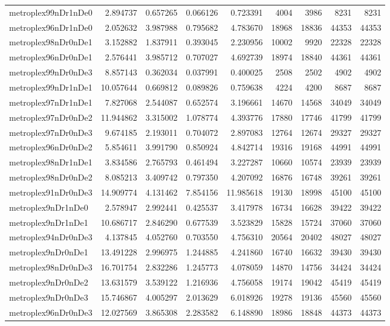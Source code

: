 \begin{longtable}{|l|r|r|r|r|r|r|r|r|}
metroplex99nDr1nDe0 & 2.894737 & 0.657265 & 0.066126 & 0.723391 & 4004 & 3986 & 8231 & 8231 \\
metroplex96nDr1nDe0 & 2.052632 & 3.987988 & 0.795682 & 4.783670 & 18968 & 18836 & 44353 & 44353 \\
metroplex98nDr0nDe1 & 3.152882 & 1.837911 & 0.393045 & 2.230956 & 10002 & 9920 & 22328 & 22328 \\
metroplex96nDr0nDe1 & 2.576441 & 3.985712 & 0.707027 & 4.692739 & 18974 & 18840 & 44361 & 44361 \\
metroplex99nDr0nDe3 & 8.857143 & 0.362034 & 0.037991 & 0.400025 & 2508 & 2502 & 4902 & 4902 \\
metroplex99nDr1nDe1 & 10.057644 & 0.669812 & 0.089826 & 0.759638 & 4224 & 4200 & 8687 & 8687 \\
metroplex97nDr1nDe1 & 7.827068 & 2.544087 & 0.652574 & 3.196661 & 14670 & 14568 & 34049 & 34049 \\
metroplex97nDr0nDe2 & 11.944862 & 3.315002 & 1.078774 & 4.393776 & 17880 & 17746 & 41799 & 41799 \\
metroplex97nDr0nDe3 & 9.674185 & 2.193011 & 0.704072 & 2.897083 & 12764 & 12674 & 29327 & 29327 \\
metroplex96nDr0nDe2 & 5.854611 & 3.991790 & 0.850924 & 4.842714 & 19316 & 19168 & 44991 & 44991 \\
metroplex98nDr1nDe1 & 3.834586 & 2.765793 & 0.461494 & 3.227287 & 10660 & 10574 & 23939 & 23939 \\
metroplex98nDr0nDe2 & 8.085213 & 3.409742 & 0.797350 & 4.207092 & 16876 & 16748 & 39261 & 39261 \\
metroplex91nDr0nDe3 & 14.909774 & 4.131462 & 7.854156 & 11.985618 & 19130 & 18998 & 45100 & 45100 \\
metroplex9nDr1nDe0 & 2.578947 & 2.992441 & 0.425537 & 3.417978 & 16734 & 16628 & 39422 & 39422 \\
metroplex9nDr1nDe1 & 10.686717 & 2.846290 & 0.677539 & 3.523829 & 15828 & 15724 & 37060 & 37060 \\
metroplex94nDr0nDe3 & 4.137845 & 4.052760 & 0.703550 & 4.756310 & 20564 & 20402 & 48027 & 48027 \\
metroplex9nDr0nDe1 & 13.491228 & 2.996975 & 1.244885 & 4.241860 & 16740 & 16632 & 39430 & 39430 \\
metroplex98nDr0nDe3 & 16.701754 & 2.832286 & 1.245773 & 4.078059 & 14870 & 14756 & 34424 & 34424 \\
metroplex9nDr0nDe2 & 13.631579 & 3.539122 & 1.216936 & 4.756058 & 19174 & 19042 & 45419 & 45419 \\
metroplex9nDr0nDe3 & 15.746867 & 4.005297 & 2.013629 & 6.018926 & 19278 & 19136 & 45560 & 45560 \\
metroplex96nDr0nDe3 & 12.027569 & 3.865308 & 2.283582 & 6.148890 & 18986 & 18848 & 44373 & 44373 \\
\end{longtable}

